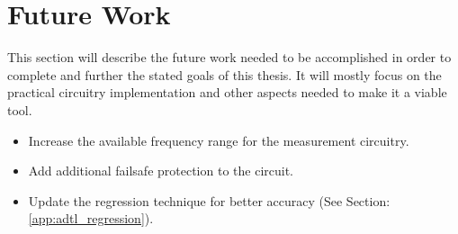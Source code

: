 \section {Future Work}

This section will describe the future work needed to be accomplished in order to complete and further the stated goals of this thesis. It will mostly focus on the practical circuitry implementation and other aspects needed to make it a viable tool.

\begin{itemize}
    \item Increase the available frequency range for the measurement circuitry.
    \item Add additional failsafe protection to the circuit.
    \item Update the regression technique for better accuracy (See Section: \ref{app:adtl_regression}).
\end{itemize}

